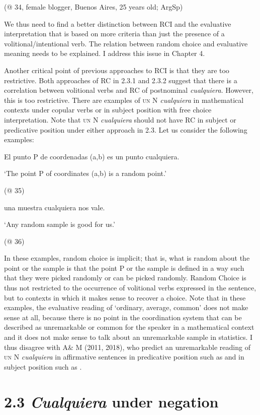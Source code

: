   (@ 34, female blogger, Buenos Aires, 25 years old; ArgSp)

We thus need to find a better distinction between RCI and the evaluative interpretation that is based on more criteria than just the presence of a volitional/intentional verb. The relation between random choice and evaluative meaning needs to be explained. I address this issue in Chapter 4. 

  Another critical point of previous approaches to RCI is that they are too restrictive. Both approaches of RC in 2.3.1 and 2.3.2 suggest that there is a correlation between volitional verbs and RC of postnominal \textit{cualquiera}. However, this is too restrictive. There are examples of \textsc{un} N \textit{cualquiera} in mathematical contexts under copular verbs or in subject position with free choice interpretation. Note that \textsc{un} N \textit{cualquiera} should not have RC in subject or predicative position under either approach in 2.3. Let us consider the following examples:

\label{bkm:Ref43031271}  El punto P de coordenadas (a,b) es un punto cualquiera.

  ‘The point P of coordinates (a,b) is a random point.’

  (@ 35)

\label{bkm:Ref43031168}  una muestra cualquiera nos vale.

  ‘Any random sample is good for us.’ 

  (@ 36)

In these examples, random choice is implicit; that is, what is random about the point or the sample is that the point P or the sample is defined in a way such that they were picked randomly or can be picked randomly. Random Choice is thus not restricted to the occurrence of volitional verbs expressed in the sentence, but to contexts in which it makes sense to recover a choice. Note that in these examples, the evaluative reading of ‘ordinary, average, common’ does not make sense at all, because there is no point in the coordination system that can be described as unremarkable or common for the speaker in a mathematical context and it does not make sense to talk about an unremarkable sample in statistics. I thus disagree with A\& M (2011, 2018), who predict an unremarkable reading of \textsc{un} N \textit{cualquiera} in affirmative sentences in predicative position such as  and in subject position such as .

\section{\textbf{2.3} \textbf{\textit{Cualquiera}} \textbf{under} \textbf{negation}}

